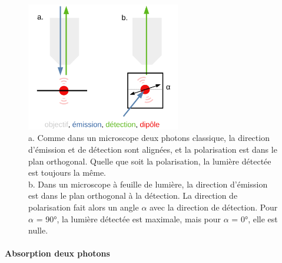 
\begin{figure}
\centering
\includegraphics[width=0.6\textwidth]{./files/polarization_plane.svg.png}
\caption{a. Comme dans un microscope deux photons classique, la direction d'émission et de détection sont alignées, et la polarisation est dans le plan orthogonal. Quelle que soit la polarisation, la lumière détectée est toujours la même.
\\ b. Dans un microscope à feuille de lumière, la direction d'émission est dans le plan orthogonal à la détection. La direction de polarisation fait alors un angle $\alpha$ avec la direction de détection. Pour $\alpha$ = 90°, la lumière détectée est maximale, mais pour $\alpha$ = 0°, elle est nulle.
\label{FIGpolarisation}}
\end{figure}


\paragraph{Absorption deux photons}


